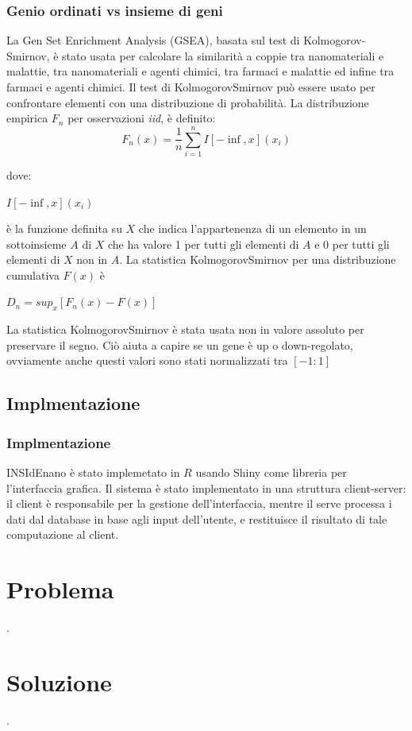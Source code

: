 \documentclass{beamer}
\begin{document}
\begin{frame}
\frametitle{Genio ordinati vs insieme di geni}
La Gen Set Enrichment Analysis (GSEA), basata sul test di Kolmogorov-Smirnov, è stato usata per calcolare la similarità a coppie tra nanomateriali e malattie, tra nanomateriali e agenti chimici, tra farmaci e malattie ed infine tra farmaci e agenti chimici. Il test di KolmogorovSmirnov può essere usato per confrontare elementi con una distribuzione di probabilità. La distribuzione empirica $F_n$ per osservazioni \textit{iid}, è definito:
\begin{equation}
F_n(x) = \frac{1}{n} \sum\limits_{i=1}^n I[-\inf,x](x_i)
\end{equation}
\end{frame}

\begin{frame}
dove:
\begin{center}
$I[-\inf,x](x_i)$
\end{center}
è la funzione definita su $X$ che indica l'appartenenza di un elemento in un sottoinsieme $A$ di $X$ che ha valore 1 per tutti gli elementi di $A$ e 0 per tutti gli elementi di $X$ non in $A$. La statistica KolmogorovSmirnov per una distribuzione cumulativa $F(x)$ è 
\begin{center}
$D_n = sup_x[F_n(x)- F(x)]$
\end{center}
La statistica KolmogorovSmirnov è stata usata non in valore assoluto per preservare il segno. Ciò aiuta a capire se un gene è up o down-regolato, ovviamente anche questi valori sono stati normalizzati tra $[-1:1]$
\end{frame}

\subsection{Implmentazione}
\begin{frame}
\frametitle{Implmentazione}
INSIdEnano è stato implemetato in $R$ usando Shiny come libreria per l'interfaccia grafica. Il sistema è stato implementato in una struttura client-server: il client è responsabile per la gestione dell'interfaccia, mentre il serve processa i dati dal database in base agli input dell'utente,  e restituisce il risultato di tale computazione al client.
\end{frame}


\section{Problema}
\begin{frame}
.
\end{frame}

\section{Soluzione}
\begin{frame}
.
\end{frame}
\end{document}
